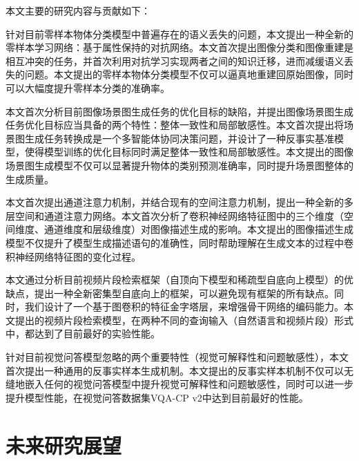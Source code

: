 本文主要的研究内容与贡献如下：
\begin{asparaenum}
\item 针对目前零样本物体分类模型中普遍存在的语义丢失的问题，本文提出一种全新的零样本学习网络：基于属性保持的对抗网络。本文首次提出图像分类和图像重建是相互冲突的任务，并首次利用对抗学习实现两者之间的知识迁移，进而减缓语义丢失的问题。本文提出的零样本物体分类模型不仅可以逼真地重建回原始图像，同时可以大幅度提升零样本分类的准确率。

\item 本文首次分析目前图像场景图生成任务的优化目标的缺陷，并提出图像场景图生成任务优化目标应当具备的两个特性：整体一致性和局部敏感性。本文首次提出将场景图生成任务转换成是一个多智能体协同决策问题，并设计了一种反事实基准模型，使得模型训练的优化目标同时满足整体一致性和局部敏感性。本文提出的图像场景图生成模型不仅可以显著提升物体的类别预测准确率，同时提升场景图整体的生成质量。

\item 本文首次提出通道注意力机制，并结合现有的空间注意力机制，提出一种全新的多层空间和通道注意力网络。本文首次分析了卷积神经网络特征图中的三个维度（空间维度、通道维度和层级维度）对图像描述生成的影响。本文提出的图像描述生成模型不仅提升了模型生成描述语句的准确性，同时帮助理解在生成文本的过程中卷积神经网络特征图的变化过程。

\item 本文通过分析目前视频片段检索框架（自顶向下模型和稀疏型自底向上模型）的优缺点，提出一种全新密集型自底向上的框架，可以避免现有框架的所有缺点。同时，我们设计了一个基于图卷积的特征金字塔层，来增强骨干网络的编码能力。本文提出的视频片段检索模型，在两种不同的查询输入（自然语言和视频片段）形式中，都达到了目前最好的实验性能。

\item 针对目前视觉问答模型忽略的两个重要特性（视觉可解释性和问题敏感性），本文首次提出一种通用的反事实样本生成机制。本文提出的反事实样本机制不仅可以无缝地嵌入任何的视觉问答模型中提升视觉可解释性和问题敏感性，同时可以进一步提升模型性能，在视觉问答数据集VQA-CP v2中达到目前最好的性能。

\end{asparaenum}

\section{未来研究展望}

